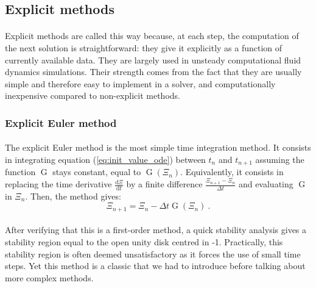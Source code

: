    \subsection{Explicit methods}

      \paragraph{}
      Explicit methods are called this way because, at each step, the computation of the next solution is straightforward: they give it explicitly as a function of currently available data.
      They are largely used in unsteady computational fluid dynamics simulations.
      Their strength comes from the fact that they are usually simple and therefore easy to implement in a solver, and computationally inexpensive compared to non-explicit methods.


      \subsubsection{Explicit Euler method}

        \paragraph{}
        The explicit Euler method is the most simple time integration method.
        It consists in integrating equation (\ref{eq:init_value_ode}) between $t_n$ and $t_{n+1}$ assuming the function $\operatorname{G}$ stays constant, equal to $\operatorname{G}\left(\Xi_n\right)$.
        Equivalently, it consists in replacing the time derivative $\frac{\mathrm{d} \Xi}{\mathrm{d} t}$ by a finite difference $\frac{\Xi_{n+1} - \Xi_n}{\Delta t}$ and evaluating $\operatorname{G}$ in $\Xi_n$.
        Then, the method gives:
        \begin{equation}
          \Xi_{n+1} = \Xi_n - \Delta t \operatorname{G}\left(\Xi_n\right) \ .
        \end{equation}

        \paragraph{}
        After verifying that this is a first-order method, a quick stability analysis gives a stability region equal to the open unity disk centred in -1.
        Practically, this stability region is often deemed unsatisfactory as it forces the use of small time steps.
        Yet this method is a classic that we had to introduce before talking about more complex methods.


